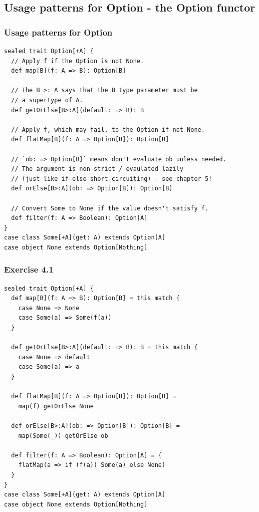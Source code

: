 \documentclass{beamer}
\begin{document}
\subsection{Usage patterns for {\ttfamily Option} - the {\ttfamily Option} functor}

\begin{frame}[fragile,t]
  \frametitle{Usage patterns for {\ttfamily Option}}
\begin{lstlisting}
sealed trait Option[+A] {
  // Apply f if the Option is not None.
  def map[B](f: A => B): Option[B]

  // The B >: A says that the B type parameter must be
  // a supertype of A.
  def getOrElse[B>:A](default: => B): B

  // Apply f, which may fail, to the Option if not None.
  def flatMap[B](f: A => Option[B]): Option[B]

  // `ob: => Option[B]` means don't evaluate ob unless needed.
  // The argument is non-strict / evaulated lazily
  // (just like if-else short-circuiting) - see chapter 5!
  def orElse[B>:A](ob: => Option[B]): Option[B]

  // Convert Some to None if the value doesn't satisfy f.
  def filter(f: A => Boolean): Option[A]
}
case class Some[+A](get: A) extends Option[A]
case object None extends Option[Nothing]
\end{lstlisting}
\end{frame}

\begin{frame}[fragile,t]
\frametitle{Exercise 4.1}
\begin{lstlisting}
sealed trait Option[+A] {
  def map[B](f: A => B): Option[B] = this match {
    case None => None
    case Some(a) => Some(f(a))
  }

  def getOrElse[B>:A](default: => B): B = this match {
    case None => default
    case Some(a) => a
  }

  def flatMap[B](f: A => Option[B]): Option[B] =
    map(f) getOrElse None

  def orElse[B>:A](ob: => Option[B]): Option[B] =
    map(Some(_)) getOrElse ob

  def filter(f: A => Boolean): Option[A] = {
    flatMap(a => if (f(a)) Some(a) else None)
  }
}
case class Some[+A](get: A) extends Option[A]
case object None extends Option[Nothing]
\end{lstlisting}
\end{frame}
\end{document}

